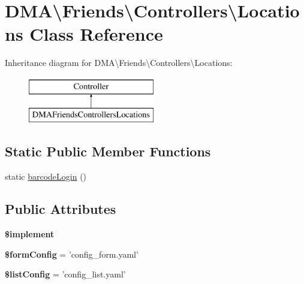 \hypertarget{classDMA_1_1Friends_1_1Controllers_1_1Locations}{\section{D\+M\+A\textbackslash{}Friends\textbackslash{}Controllers\textbackslash{}Locations Class Reference}
\label{classDMA_1_1Friends_1_1Controllers_1_1Locations}
}
Inheritance diagram for D\+M\+A\textbackslash{}Friends\textbackslash{}Controllers\textbackslash{}Locations\+:\begin{figure}[H]
\begin{center}
\leavevmode
\includegraphics[height=2.000000cm]{d2/d9c/classDMA_1_1Friends_1_1Controllers_1_1Locations}
\end{center}
\end{figure}
\subsection*{Static Public Member Functions}
\begin{DoxyCompactItemize}
\item 
static \hyperlink{classDMA_1_1Friends_1_1Controllers_1_1Locations_a9b6fce6b3f0cf4fe6671fe110b0c8791}{barcode\+Login} ()
\end{DoxyCompactItemize}
\subsection*{Public Attributes}
\begin{DoxyCompactItemize}
\item 
{\bfseries \$implement}
\item 
\hypertarget{classDMA_1_1Friends_1_1Controllers_1_1Locations_a8a769617e49a5e862fa8633b75467223}{{\bfseries \$form\+Config} = 'config\+\_\+form.\+yaml'}\label{classDMA_1_1Friends_1_1Controllers_1_1Locations_a8a769617e49a5e862fa8633b75467223}

\item 
\hypertarget{classDMA_1_1Friends_1_1Controllers_1_1Locations_a54b41dd09d63dafca0bff7528a8c27e1}{{\bfseries \$list\+Config} = 'config\+\_\+list.\+yaml'}\label{classDMA_1_1Friends_1_1Controllers_1_1Locations_a54b41dd09d63dafca0bff7528a8c27e1}

\end{DoxyCompactItemize}


